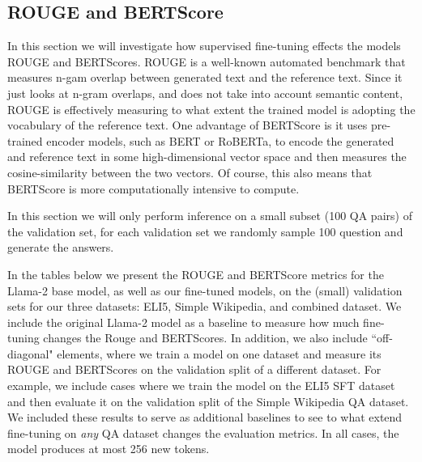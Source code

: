 \documentclass[11pt, oneside]{article}   	%
\begin{document}
\subsection{ROUGE and BERTScore}
In this section we will investigate how supervised fine-tuning effects the models ROUGE and BERTScores.
ROUGE is a well-known automated benchmark that measures n-gam overlap between generated text and the reference text.
Since it just looks at n-gram overlaps, and does not take into account semantic content, ROUGE is effectively measuring to what extent the trained model is adopting the vocabulary of the reference text.
One advantage of BERTScore is it uses pre-trained encoder models, such as BERT or RoBERTa, to encode the generated and reference text in some high-dimensional vector space and then measures the cosine-similarity between the two vectors.
Of course, this also means that BERTScore is more computationally intensive to compute.

In this section we will only perform inference on a small subset (100 QA pairs) of the validation set, for each validation set we randomly sample 100 question and generate the answers.

In the tables below we present the ROUGE and BERTScore metrics for the Llama-2 base model, as well as our fine-tuned models, on the (small) validation sets for our three datasets: ELI5, Simple Wikipedia, and combined dataset.
We include the original Llama-2 model as a baseline to measure how much fine-tuning changes the Rouge and BERTScores.
In addition, we also include ``off-diagonal" elements, where we train a model on one dataset and measure its ROUGE and BERTScores on the validation split of a different dataset.
For example, we include cases where we train the model on the ELI5 SFT dataset and then evaluate it on the validation split of the Simple Wikipedia QA dataset.
We included these results to serve as additional baselines to see to what extend fine-tuning on \textit{any} QA dataset changes the evaluation metrics.
In all cases, the model produces at most 256 new tokens.
\end{document}
